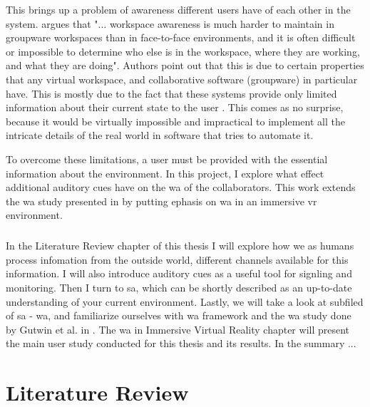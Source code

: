  This brings up a problem of awareness different users have of each other in the system. \cite{gutwin_descriptive_2002} argues that "... workspace awareness is much harder to maintain in groupware workspaces than in face-to-face environments, and it is often difficult or impossible to determine who else is in the workspace, where they are working, and what they are doing". Authors point out that this is due to certain properties that any virtual workspace, and collaborative software (groupware) in particular have. This is mostly due to the fact that these systems provide only limited information about their current state to the user \cite[p.~414-415]{gutwin_descriptive_2002}. This comes as no surprise, because it would be virtually impossible and impractical to implement all the intricate details of the real world in software that tries to automate it. 
  

 To overcome these limitations, a user must be provided with the essential information about the environment. In this project, I explore what effect additional auditory cues have on the \gls{wa} of the collaborators. This work extends the \gls{wa} study presented in \cite{gutwin_chalk_2011} by putting ephasis on \gls{wa} in an immersive \gls{vr} environment.
 

\paragraph{}
In the Literature Review chapter of this thesis I will explore how we as humans process infomation from the outside world, different channels available for this information. I will also introduce auditory cues as a useful tool for signling and monitoring. Then I turn to \gls{sa}, which can be shortly described as an up-to-date understanding of your current environment. Lastly, we will take a look at subfiled of \gls{sa} - \gls{wa}, and familiarize ourselves with \gls{wa} framework and the \gls{wa} study done by Gutwin et al. in \cite{gutwin_chalk_2011}. The \gls{wa} in Immersive Virtual Reality chapter will present the main user study conducted for this thesis and its results. In the summary ...



\chapter{Literature Review}
